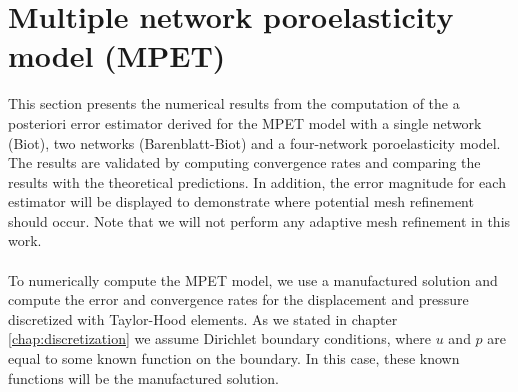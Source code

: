 
\section{Multiple network poroelasticity model (MPET)} \label{section:num_exp_mpet}
This section presents the numerical results from the computation of the a posteriori error estimator derived for the MPET model with a single network (Biot), two networks (Barenblatt-Biot) and a four-network poroelasticity model. The results are validated by computing convergence rates and comparing the results with the theoretical predictions. In addition, the error magnitude for each estimator will be displayed to demonstrate where potential mesh refinement should occur. Note that we will not perform any adaptive mesh refinement in this work. 
\\
\\
To numerically compute the MPET model, we use a manufactured solution and compute the error and convergence rates for the displacement and pressure discretized with Taylor-Hood elements. As we stated in chapter \ref{chap:discretization} we assume Dirichlet boundary conditions, where $u$ and $p$ are equal to some known function on the boundary. In this case, these known functions will be the manufactured solution. 

